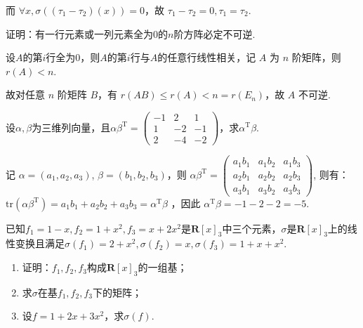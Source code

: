 \begin{exercise}
\begin{exgroup}
\begin{answer}
            而 $\forall x, \sigma((\tau_1-\tau_2)(x))=0$，故 $\tau_1-\tau_2=0, \tau_1=\tau_2$.
        \end{answer}

        \item 证明：有一行元素或一列元素全为0的$n$阶方阵必定不可逆.
        \begin{answer}
            设$A$的第$i$行全为0，则$A$的第$i$行与$A$的任意行线性相关，记 $A$ 为 $n$ 阶矩阵，则$r(A) < n$.

            故对任意 $n$ 阶矩阵 $B$，有 $r(AB) \leqslant r(A) < n = r(E_n)$，故 $A$ 不可逆.
        \end{answer}

        \item 设$\alpha,\beta$为三维列向量，且$\alpha\beta^\mathrm{T}=\begin{pmatrix}
                -1 & 2  & 1  \\
                1  & -2 & -1 \\
                2  & -4 & -2
            \end{pmatrix}$，求$\alpha^\mathrm{T}\beta$.
        \begin{answer}
            记 $\alpha = (a_1,a_2,a_3)$, $\beta = (b_1,b_2,b_3)$，则 $\alpha\beta^\mathrm{T} = \begin{pmatrix}
                    a_1b_1 & a_1b_2 & a_1b_3 \\
                    a_2b_1 & a_2b_2 & a_2b_3 \\
                    a_3b_1 & a_3b_2 & a_3b_3
                \end{pmatrix}$,
            则有：$\text{tr}(\alpha\beta^\mathrm{T}) = a_1b_1+a_2b_2+a_3b_3 = \alpha^\mathrm{T}\beta$ ，因此 $\alpha^\mathrm{T}\beta = -1-2-2 = -5$.
        \end{answer}
    \end{exgroup}

    \begin{exgroup}
        \item 已知$f_1=1-x,f_2=1+x^2,f_3=x+2x^2$是$\mathbf{R}[x]_3$中三个元素，$\sigma$是$\mathbf{R}[x]_3$上的线性变换且满足$\sigma(f_1)=2+x^2,\sigma(f_2)=x,\sigma(f_3)=1+x+x^2$.
        \begin{enumerate}
            \item 证明：$f_1,f_2,f_3$构成$\mathbf{R}[x]_3$的一组基；

            \item 求$\sigma$在基$f_1,f_2,f_3$下的矩阵；

            \item 设$f=1+2x+3x^2$，求$\sigma(f)$.
        \end{enumerate}


\end{exgroup}
\end{exercise}

